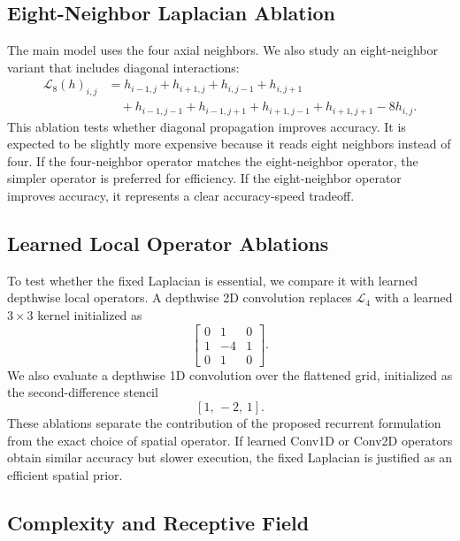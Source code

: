 \documentclass[11pt]{article}
\newcommand{\Lap}{\mathcal{L}}
\begin{document}
\subsection{Eight-Neighbor Laplacian Ablation}

The main model uses the four axial neighbors. We also study an eight-neighbor
variant that includes diagonal interactions:
\[
\begin{aligned}
    \Lap_8(h)_{i,j}
    &=
    h_{i-1,j} + h_{i+1,j} + h_{i,j-1} + h_{i,j+1} \\
    &\quad
    + h_{i-1,j-1} + h_{i-1,j+1}
    + h_{i+1,j-1} + h_{i+1,j+1}
    - 8h_{i,j}.
\end{aligned}
\]
This ablation tests whether diagonal propagation improves accuracy. It is expected
to be slightly more expensive because it reads eight neighbors instead of four.
If the four-neighbor operator matches the eight-neighbor operator, the simpler
operator is preferred for efficiency. If the eight-neighbor operator improves
accuracy, it represents a clear accuracy-speed tradeoff.

\subsection{Learned Local Operator Ablations}

To test whether the fixed Laplacian is essential, we compare it with learned
depthwise local operators. A depthwise 2D convolution replaces $\Lap_4$ with a
learned $3\times3$ kernel initialized as
\[
    \begin{bmatrix}
    0 & 1 & 0 \\
    1 & -4 & 1 \\
    0 & 1 & 0
    \end{bmatrix}.
\]
We also evaluate a depthwise 1D convolution over the flattened grid, initialized
as the second-difference stencil
\[
    [1,\,-2,\,1].
\]
These ablations separate the contribution of the proposed recurrent formulation
from the exact choice of spatial operator. If learned Conv1D or Conv2D operators
obtain similar accuracy but slower execution, the fixed Laplacian is justified as
an efficient spatial prior.

\subsection{Complexity and Receptive Field}
\end{document}
